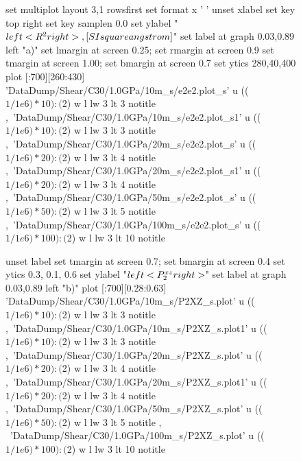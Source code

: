 \documentclass[5p]{elsarticle}
\begin{document}
\begin{figure}[htp]
    	\begin{center}
		\begin{gnuplot}[terminal=epslatex, terminaloptions={size \SERFigwidth cm, \SERFigheight cm color solid}]
			set multiplot layout 3,1 rowsfirst
			set format x ' '
			unset xlabel
			set key top right
			set key samplen  0.0
			set ylabel "$\\left< R^2\\right>  \\,[\\SI{}{\\square\\angstrom}]$"          
			set label at graph 0.03,0.89 left "a)"
			set lmargin at screen 0.25; set rmargin at screen 0.9
			set tmargin at screen 1.00; set bmargin at screen 0.7
			set ytics 280,40,400 
			plot [:700][260:430] 	'DataDump/Shear/C30/1.0GPa/10m_s/e2e2.plot_s'  u  (($1/1e6)*10):($2) w l  lw 3   lt 3  notitle   ,\
			'DataDump/Shear/C30/1.0GPa/10m_s/e2e2.plot_s1'  u  (($1/1e6)*10):($2) w l  lw 3   lt 3  notitle   ,\
								'DataDump/Shear/C30/1.0GPa/20m_s/e2e2.plot_s'  u  (($1/1e6)*20):($2) w l  lw 3   lt 4  notitle   ,\
								'DataDump/Shear/C30/1.0GPa/20m_s/e2e2.plot_s1'  u  (($1/1e6)*20):($2) w l  lw 3   lt 4  notitle   ,\
								'DataDump/Shear/C30/1.0GPa/50m_s/e2e2.plot_s'   u (($1/1e6)*50):($2) w l  lw 3   lt 5  notitle  ,\
								'DataDump/Shear/C30/1.0GPa/100m_s/e2e2.plot_s' u  (($1/1e6)*100):($2) w l  lw 3   lt 10  notitle  
			
			unset label
			set tmargin at screen 0.7; set bmargin at screen 0.4
			set ytics 0.3, 0.1, 0.6			
			set ylabel "$\\left<P_{2}^{xz}\\right>$"        
			set label at graph 0.03,0.89 left "b)"  
			plot  [:700][0.28:0.63]	'DataDump/Shear/C30/1.0GPa/10m_s/P2XZ_s.plot' u   (($1/1e6)*10):($2) w l lw 3 lt 3  notitle   ,\
			'DataDump/Shear/C30/1.0GPa/10m_s/P2XZ_s.plot1' u   (($1/1e6)*10):($2) w l lw 3 lt 3  notitle   ,\
								'DataDump/Shear/C30/1.0GPa/20m_s/P2XZ_s.plot' u   (($1/1e6)*20):($2) w l  lw 3  lt 4  notitle ,\
								'DataDump/Shear/C30/1.0GPa/20m_s/P2XZ_s.plot1' u   (($1/1e6)*20):($2) w l  lw 3  lt 4  notitle ,\
								'DataDump/Shear/C30/1.0GPa/50m_s/P2XZ_s.plot' u  (($1/1e6)*50):($2) w l  lw 3   lt 5  notitle , \
								'DataDump/Shear/C30/1.0GPa/100m_s/P2XZ_s.plot' u  (($1/1e6)*100):($2) w l  lw 3  lt 10   notitle


\end{gnuplot}
\end{center}
\end{figure}
\end{document}
